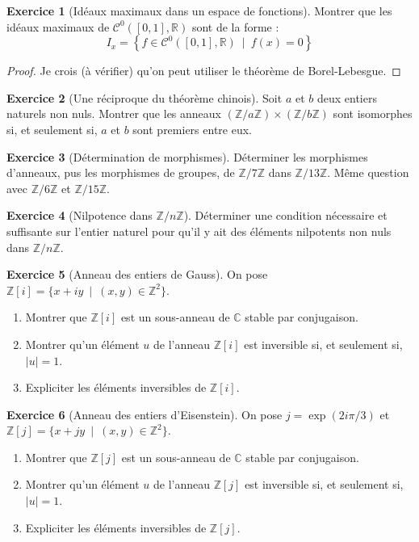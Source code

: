 \documentclass[french]{book}
\newcommand{\Z}{\mathbb{Z}}
\newcommand{\R}{\mathbb{R}}
\newcommand{\C}{\mathbb{C}}
\theoremstyle{definition}
\newtheorem{ex}{Exercice}[chapter]
\theoremstyle{theorem}
\theoremstyle{remark}
\begin{document}
\begin{ex}[Idéaux maximaux dans un espace de fonctions]
	Montrer que les idéaux maximaux de $\mathcal{C}^0([0,1],\R)$ sont de la forme : $$I_x=\left\{f\in\mathcal{C}^0([0,1],\R)\ \mid\ f(x)=0\right\}$$
\end{ex}

\begin{proof}
	Je crois (à vérifier) qu'on peut utiliser le théorème de Borel-Lebesgue.
\end{proof}

\begin{ex}[Une réciproque du théorème chinois]
	Soit $a$ et $b$ deux entiers naturels non nuls. Montrer que les anneaux $(\Z/a\Z)\times(\Z/b\Z)$ sont isomorphes si, et seulement si, $a$ et $b$ sont premiers entre eux.
\end{ex}

\begin{ex}[Détermination de morphismes]
	Déterminer les morphismes d'anneaux, pus les morphismes de groupes, de $\Z/7\Z$ dans $\Z/13\Z$. Même question avec $\Z/6\Z$ et $\Z/15\Z$.
\end{ex}

\begin{ex}[Nilpotence dans $\Z/n\Z$]
	Déterminer une condition nécessaire et suffisante sur l'entier naturel pour qu'il y ait des éléments nilpotents non nuls dans $\Z/n\Z$.
\end{ex}

\begin{ex}[Anneau des entiers de Gauss]
	On pose $\Z[i]=\{x+iy\ \mid\ (x,y)\in\Z^2\}$.
	\begin{enumerate}
		\item Montrer que $\Z[i]$ est un sous-anneau de $\C$ stable par conjugaison.
		\item Montrer qu'un élément $u$ de l'anneau $\Z[i]$ est inversible si, et seulement si, $\lvert u\rvert=1$.
		\item Expliciter les éléments inversibles de $\Z[i]$.
	\end{enumerate}
\end{ex}

\begin{ex}[Anneau des entiers d'Eisenstein]
	On pose $j=\exp\left(2i\pi/3\right)$ et $\Z[j]=\{x+jy\ \mid\ (x,y)\in\Z^2\}$.
	\begin{enumerate}
		\item Montrer que $\Z[j]$ est un sous-anneau de $\C$ stable par conjugaison.
		\item Montrer qu'un élément $u$ de l'anneau $\Z[j]$ est inversible si, et seulement si, $\lvert u\rvert=1$.
		\item Expliciter les éléments inversibles de $\Z[j]$.
	\end{enumerate}
\end{ex}
\end{document}
